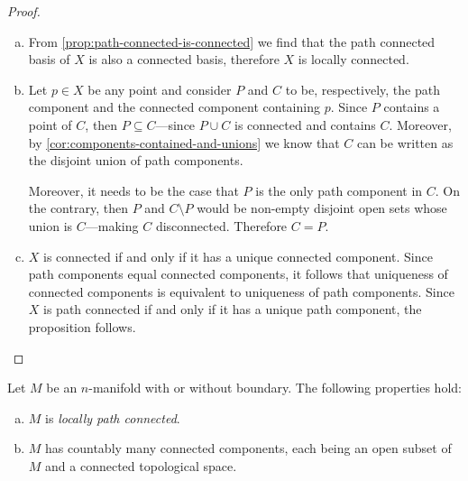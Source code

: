 \begin{proof}
\begin{enumerate}[(a)]\setlength\itemsep{0em}
\item From \cref{prop:path-connected-is-connected} we find that the path
  connected basis of \(X\) is also a connected basis, therefore \(X\) is locally connected.

\item Let \(p \in X\) be any point and consider \(P\) and \(C\) to be,
  respectively, the path component and the connected component containing
  \(p\). Since \(P\) contains a point of \(C\), then \(P \subseteq C\)---since
  \(P \cup C\) is connected and contains \(C\). Moreover, by
  \cref{cor:components-contained-and-unions} we know that \(C\) can be written
  as the disjoint union of path components.

  Moreover, it needs to be the case that \(P\) is the only path component in
  \(C\). On the contrary, then \(P\) and \(C \setminus P\) would be non-empty
  disjoint open sets whose union is \(C\)---making \(C\)
  disconnected. Therefore \(C = P\).

\item \(X\) is connected if and only if it has a unique connected
  component. Since path components equal connected components, it follows that
  uniqueness of connected components is equivalent to uniqueness of path
  components. Since \(X\) is path connected if and only if it has a unique path
  component, the proposition follows.
\end{enumerate}
\end{proof}

\begin{proposition}
\label{prop:connectivity-manifolds}
Let \(M\) be an \(n\)-manifold with or without boundary. The following
properties hold:
\begin{enumerate}[(a)]\setlength\itemsep{0em}
\item \(M\) is \emph{locally path connected}.

\item \(M\) has countably many connected components, each being an open subset
  of \(M\) and a connected topological space.
\end{enumerate}
\end{proposition}


